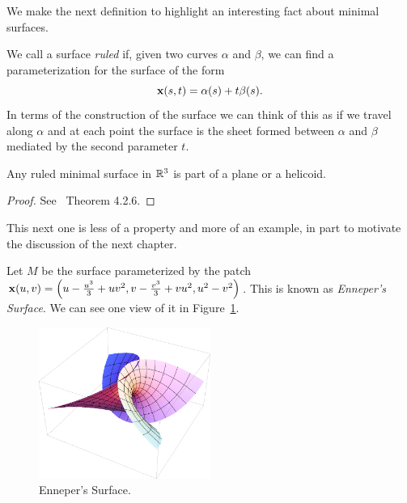   We make the next definition to highlight an interesting fact about minimal surfaces.
  \begin{defn}
    We call a surface \emph{ruled} if, given two curves $\alpha$ and $\beta$, we can find a parameterization for the surface of the form
    \[
      \mathbf{x}(s, t) = \alpha(s) + t\beta(s).
    \]
    In terms of the construction of the surface we can think of this as if we travel along $\alpha$ and at each point the surface is the sheet formed between $\alpha$ and $\beta$ mediated by the second parameter $t$. 
  \end{defn}

  \begin{thm}
    Any ruled minimal surface in $\mathbb{R}^3$ is part of a plane or a helicoid.
  \end{thm}
  \begin{proof}
    See~\cite{Opr07} Theorem 4.2.6.
  \end{proof}

  This next one is less of a property and more of an example, in part to motivate the discussion of the next chapter.

  \begin{ex}
    \label{ex:ennepers_surface}
    Let $M$ be the surface parameterized by the patch $\mathbf{x}(u, v) = \left(u - \frac{u^3}{3} + uv^2, v - \frac{v^3}{3} + vu^2, u^2 - v^2\right)$. This is known as \emph{Enneper's Surface}. We can see one view of it in Figure~\ref{fig:ennepers_surface}.

    \begin{figure}[t] %
      \centering
      \includegraphics[width=0.5\textwidth]{figures/ennepers_surface.pdf}
      \caption{Enneper's Surface.}
      \label{fig:ennepers_surface}
    \end{figure}
  \end{ex}

